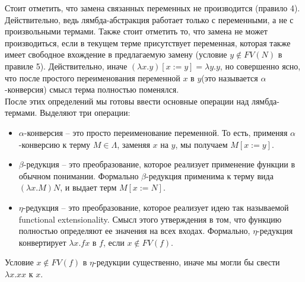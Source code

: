Стоит отметить, что замена связанных переменных не производится (правило 4). Действительно, ведь лямбда-абстракция работает
только с переменными, а не с произвольными термами. Также стоит отметить то, что замена не может производиться, если
в текущем терме присутствует переменная, которая также имеет свободное вхождение в предлагаемую замену
(условие $y \not \in FV(N)$ в правиле 5). Действительно, иначе $(\lambda x . y)[x := y] = \lambda y . y$, но совершенно ясно, что
после простого переименования переменной $x$ в $y$(это называется $\alpha$-конверсия) смысл терма полностью поменялся. \\
После этих определений мы готовы ввести основные операции над лямбда-термами. Выделяют три операции:
\begin{itemize}
  \item $\alpha$-конверсия -- это просто переименование переменной.
        То есть, применяя $\alpha$-конверсию к терму $M \in \Lambda$, заменяя $x$ на $y$, мы получаем $M[x := y]$.
  \item $\beta$-редукция -- это преобразование, которое реализует применение функции в обычном понимании. Формально $\beta$-редукция
        применима к терму вида $(\lambda x . M) N$, и выдает терм $M[x := N]$.
  \item $\eta$-редукция -- это преобразование, которое реализует идею так называемой functional extensionality. Смысл этого утверждения
        в том, что функцию полностью определяют ее значения на всех входах. Формально, $\eta$-редукция конвертирует
        $\lambda x . f x$ в $f$, если $x \not \in FV(f)$.
\end{itemize}
Условие $x \not \in FV(f)$ в $\eta$-редукции существенно, иначе мы могли бы свести $\lambda x . xx$ к $x$.


